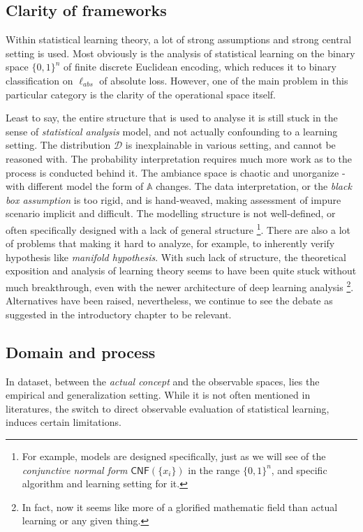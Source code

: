 \subsection{Clarity of frameworks}

Within statistical learning theory, a lot of strong assumptions and strong central setting is used. Most obviously is the analysis of statistical learning on the binary space $\{0,1\}^{n}$ of finite discrete Euclidean encoding, which reduces it to binary classification on $\ell_{abs}$ of absolute loss. However, one of the main problem in this particular category is the clarity of the operational space itself. 

Least to say, the entire structure that is used to analyse it is still stuck in the sense of \textit{statistical analysis} model, and not actually confounding to a learning setting. The distribution $\mathcal{D}$ is inexplainable in various setting, and cannot be reasoned with. The probability interpretation requires much more work as to the process is conducted behind it. The ambiance space is chaotic and unorganize - with different model the form of $\mathbb{A}$ changes. The data interpretation, or the \textit{black box assumption} is too rigid, and is hand-weaved, making assessment of impure scenario implicit and difficult. The modelling structure is not well-defined, or often specifically designed with a lack of general structure \footnote{For example, models are designed specifically, just as we will see of the \textit{conjunctive normal form} $\mathsf{CNF}(\{x_{i}\})$ in the range $\{0,1\}^{n}$, and specific algorithm and learning setting for it.}. There are also a lot of problems that making it hard to analyze, for example, to inherently verify hypothesis like \textit{manifold hypothesis}. With such lack of structure, the theoretical exposition and analysis of learning theory seems to have been quite stuck without much breakthrough, even with the newer architecture of deep learning analysis \footnote{In fact, now it seems like more of a glorified mathematic field than actual learning or any given thing.}. Alternatives have been raised, nevertheless, we continue to see the debate as suggested in the introductory chapter to be relevant. 

\subsection{Domain and process}

In dataset, between the \textit{actual concept} and the observable spaces, lies the empirical and generalization setting. While it is not often mentioned in literatures, the switch to direct observable evaluation of statistical learning, induces certain limitations. 


